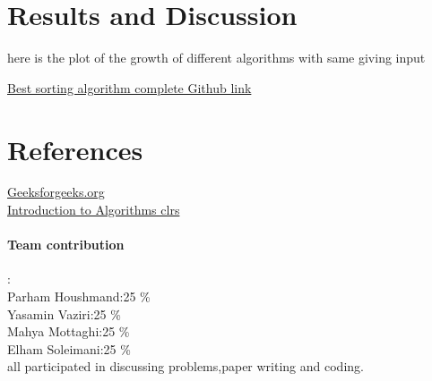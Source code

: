 \documentclass[
10pt, %
a4paper, %
oneside, %
headinclude,footinclude, %
BCOR5mm, %
]{scrartcl}
\begin{document}


 


\section{Results and Discussion}

here is the plot of the growth of different algorithms with same giving input


\href{https://github.com/prhdm/Best-sorting-algorithm}{Best sorting algorithm complete Github link}


\section{References}
 \href{https://www.geeksforgeeks.org/}{Geeksforgeeks.org}
 \\
 \href{https://www.amazon.com/Introduction-Algorithms-3rd-MIT-Press/dp/0262033844}{Introduction to Algorithms clrs}
 

\paragraph{Team contribution} :
\\
Parham Houshmand:25 \%
\\
Yasamin Vaziri:25 \%
\\
Mahya Mottaghi:25 \% 
\\
Elham Soleimani:25 \%
\\
all participated in discussing problems,paper writing and coding.
\label{fig:esempio}



\renewcommand{\refname}{\spacedlowsmallcaps{References}} %



 
\end{document}
